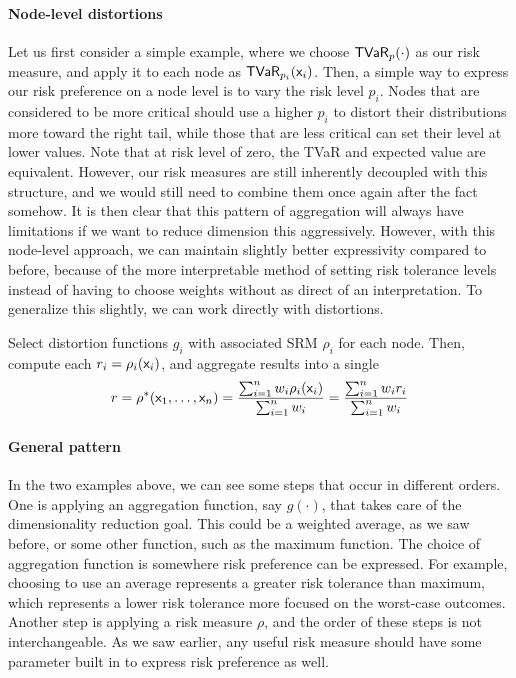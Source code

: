 \paragraph{Node-level distortions} Let us first consider a simple example, where we choose $\TVaRd{p}$ as our risk measure, and apply it to each node as $\TVaR{p_i}{\rx_i}$. Then, a simple way to express our risk preference on a node level is to vary the risk level $p_i$. Nodes that are considered to be more critical should use a higher $p_i$ to distort their distributions more toward the right tail, while those that are less critical can set their level at lower values. Note that at risk level of zero, the TVaR and expected value are equivalent. However, our risk measures are still inherently decoupled with this structure, and we would still need to combine them once again after the fact somehow. It is then clear that this pattern of aggregation will always have limitations if we want to reduce dimension this aggressively. However, with this node-level approach, we can maintain slightly better expressivity compared to before, because of the more interpretable method of setting risk tolerance levels instead of having to choose weights without as direct of an interpretation. To generalize this slightly, we can work directly with distortions.

\begin{example}
    Select distortion functions $g_i$ with associated SRM $\rho_i$ for each node. Then, compute each $r_i = \rsg{i}{\rx_i}$, and aggregate results into a single 
    \begin{equation}
    r = \rho^*(\rx_1,\ldots,\rx_n) = \frac{\sum_{i=1}^n w_i \rsg{i}{\rx_i}} {\sum_{i=1}^n w_i} = \frac{\sum_{i=1}^n w_i r_i} {\sum_{i=1}^n w_i}
    \end{equation}
\end{example}

\paragraph{General pattern} In the two examples above, we can see some steps that occur in different orders. One is applying an aggregation function, say $g(\cdot)$, that takes care of the dimensionality reduction goal. This could be a weighted average, as we saw before, or some other function, such as the maximum function. The choice of aggregation function is somewhere risk preference can be expressed. For example, choosing to use an average represents a greater risk tolerance than maximum, which represents a lower risk tolerance more focused on the worst-case outcomes. Another step is applying a risk measure $\rho$, and the order of these steps is not interchangeable. As we saw earlier, any useful risk measure should have some parameter built in to express risk preference as well. 

